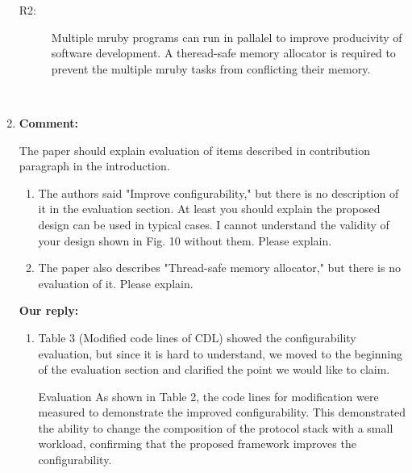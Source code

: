 \documentclass{article}
\begin{document}
\begin{enumerate}
\begin{flushleft}
\begin{itembox}[|]{}
\begin{description}
    \item[R2:]
        Multiple mruby programs can run in pallalel to improve producivity of software development.
        A theread-safe memory allocator is required to prevent the multiple mruby tasks from conflicting their memory.

\end{description}
\end{itembox}\\

\end{flushleft}

\item \begin{flushleft}
\textbf{Comment:}

The paper should explain evaluation of items described in contribution paragraph in the introduction. 

\begin{enumerate}
\item The authors said "Improve configurability," but there is no description of it in the evaluation section.  At least you should explain the proposed design can be used in typical cases. I cannot understand the validity of your design shown in Fig. 10 without them.  Please explain.

\item The paper also describes "Thread-safe memory allocator," but there is no evaluation of it. Please explain.
\end{enumerate}
\end{flushleft}

\begin{flushleft}
\textbf{Our reply:}

\begin{enumerate}
\item 
    Table 3 (Modified code lines of CDL) showed the configurability evaluation, but since it is hard to understand, we moved to the beginning of the evaluation section and clarified the point we would like to claim.

\begin{itembox}[|]{Evaluation}
As shown in Table 2, the code lines for modification were measured to demonstrate the improved configurability.
This demonstrated the ability to change the composition of the protocol stack with a small workload, confirming that the proposed framework improves the configurability.
\end{itembox}\\



\end{enumerate}
\end{flushleft}
\end{enumerate}
\end{document}
